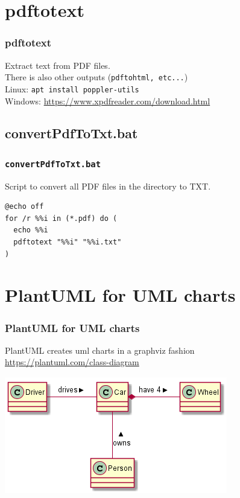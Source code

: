 \documentclass[pdf]{beamer}
\newcommand{\mono}[1]{\texttt{#1}}
\begin{document}
\section{pdftotext}
\begin{frame}
  \frametitle{pdftotext}
  Extract text from PDF files.\\
  There is also other outputs (\mono{pdftohtml, etc...})\\
  Linux: \mono{apt install poppler-utils}\\
  Windows: \url{https://www.xpdfreader.com/download.html}
\end{frame}


\subsection{convertPdfToTxt.bat}
\begin{frame}[fragile] %
  \frametitle{\mono{convertPdfToTxt.bat}}
  Script to convert all PDF files in the directory to TXT.
    \begin{lstlisting}
@echo off
for /r %%i in (*.pdf) do (
  echo %%i
  pdftotext "%%i" "%%i.txt"
)
    \end{lstlisting}
\end{frame}


\section{PlantUML for UML charts}
\begin{frame}
  \frametitle{PlantUML for UML charts}
  PlantUML creates uml charts in a graphviz fashion\\
  \url{https://plantuml.com/class-diagram}
  \begin{center}
    \includegraphics[scale=0.4]{data/plantuml-example.png}
  \end{center}
\end{frame}
\end{document}
